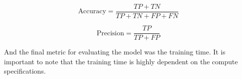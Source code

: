 \documentclass[ %
                    author={Raj Dhakan},
                supervisor={Dr. Ayush Joshi},
                    degree={MSc},
                     title={Ethereum Price Prediction using Internal and External Factors},
                  subtitle={},
                      type={},
                      year={2025}]{dissertation}
\begin{document}
\begin{equation}
\label{eq:accuracy}
\text{Accuracy} = \frac{TP + TN}{TP + TN + FP + FN}
\end{equation}

\begin{equation}
\label{eq:precision}
\text{Precision} = \frac{TP}{TP + FP}
\end{equation}

\vspace{0.25cm}
\vspace{0.5cm}

And the final metric for evaluating the model was the training time. It is important to note that the training time is highly dependent on the compute specifications.





\end{document}

